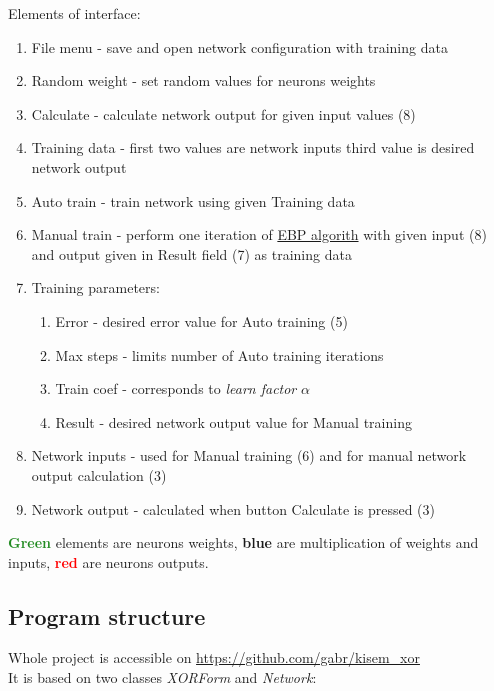 Elements of interface:
\begin{enumerate}[topsep=8pt,itemsep=-1ex,partopsep=1ex,parsep=1ex]
    \item \label{FileMenu} File menu - save and open network configuration with training data
    \item \label{RandomWeight} Random weight - set random values for neurons weights
    \item Calculate - calculate network output for given input values (8)
    \item \label{TrainingData} Training data - first two values are network inputs third value is desired network output
    \item \label{AutoTrain} Auto train - train network using given Training data
    \item Manual train - perform one iteration of \hyperref[formula:EBP]{EBP algorith} with given input (8) and output given in Result field (7) as training data
    \item Training parameters:
    \begin{enumerate}[topsep=-1ex,itemsep=-1ex,partopsep=1ex,parsep=1ex]
        \item \label{Error} Error - desired error value for Auto training (5)
        \item \label{MaxSteps} Max steps - limits number of Auto training iterations
        \item \label{TrainCoef} Train coef - corresponds to \textit{learn factor} $\alpha$
        \item Result - desired network output value for Manual training
    \end{enumerate}
    \item Network inputs - used for Manual training (6) and for manual network output calculation (3)
    \item Network output - calculated when button Calculate is pressed (3)
\end{enumerate}

\textcolor{ForestGreen}{\textbf{Green}} elements are neurons weights, \textcolor{Cerulean}{\textbf{blue}} are multiplication of weights and inputs, \textcolor{red}{\textbf{red}} are neurons outputs.

\subsection{Program structure}
\label{ProgramStrucutre}

Whole project is accessible on \url{https://github.com/gabr/kisem_xor} \\
It is based on two classes \textit{XORForm} and \textit{Network}:

